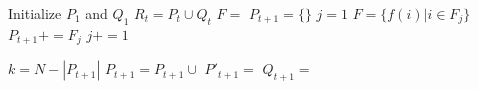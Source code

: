 \documentclass[a4paper, 12pt] {article}
\begin{document}
\begin{algorithmic}
  \State Initialize $P_1$ and $Q_1$
    \State $R_t = P_t \cup Q_t$
    \State $F = $ 
    \State $P_{t+1} = \{\}$
    \State $j = 1$
      \State $F =\{f(i) | i \in F_j\}$
      \State {}
      \State $P_{t+1} += F_j$
      \State $j+=1$
    \EndWhile
    
    \State $k = N - |P_{t+1}|$
    \State $P_{t+1} = P_{t+1} \cup$ 
    \State $P'_{t+1} =$ 
    \State $Q_{t+1} =$ 
  \EndFor
  \EndProcedure
\end{algorithmic}
\end{document}
